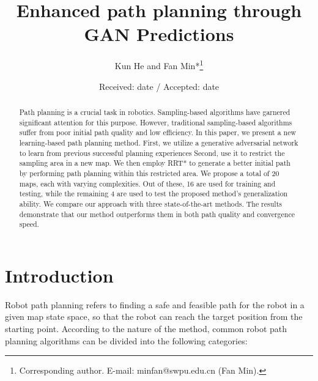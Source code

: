\documentclass[smallcondensed]{svjour3}     %
\begin{document}
\title{Enhanced path planning through GAN Predictions}

\author{Kun He and Fan Min*\thanks{Corresponding author. E-mail: minfan@swpu.edu.cn (Fan Min).} }

\date{Received: date / Accepted: date}

\maketitle

\begin{abstract}
Path planning is a crucial task in robotics.
Sampling-based algorithms have garnered significant attention for this purpose. 
However, traditional sampling-based algorithms suffer from poor initial path quality and low efficiency. 
In this paper, we present a new learning-based path planning method. 
First, we utilize a generative adversarial network to learn from previous successful planning experiences
Second, use it to restrict the sampling area in a new map. 
We then employ RRT* to generate a better initial path by performing path planning within this restricted area. 
We propose a total of 20 maps, each with varying complexities. 
Out of these, 16 are used for training and testing, while the remaining 4 are used to test the proposed method's generalization ability. 
We compare our approach with three state-of-the-art methods.
The results demonstrate that our method outperforms them in both path quality and convergence speed.
\end{abstract}

\section{Introduction}\label{sec:introduction}
Robot path planning refers to finding a safe and feasible path for the robot in a given map state space, so that the robot can reach the target position from the starting point. 
According to the nature of the method, common robot path planning algorithms can be divided into the following categories:
\end{document}
